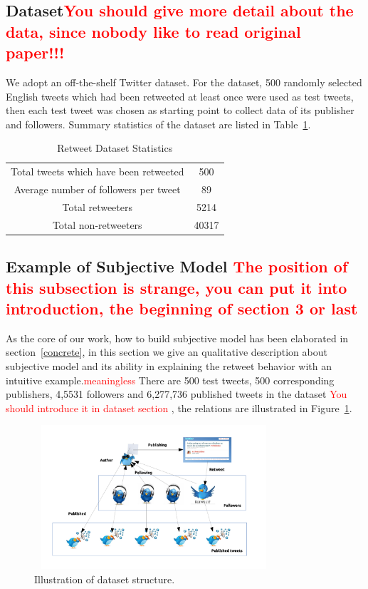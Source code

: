 \documentclass{acm_proc_article-sp}
\newcommand{\mo}[1]{\textcolor{red}{#1}}
\begin{document}
\subsection{Dataset\mo{You should give more detail about the data, since nobody like to read original paper!!!}}
We adopt an off-the-shelf Twitter dataset\cite{Luo:2013RMF}.
For the dataset, 500 randomly selected English tweets which had been retweeted at least once were used as test tweets, then each test tweet was chosen as starting point to collect data of its publisher and followers.
Summary statistics of the dataset are listed in Table~\ref{datasetstat}.
\begin{table}
\centering
\caption{Retweet Dataset Statistics}
\label{datasetstat}
\begin{tabular}{|c|c|}
\hline
Total tweets which have been retweeted & 500 \\
Average number of followers per tweet & 89 \\
Total retweeters & 5214 \\
Total non-retweeters & 40317  \\
\hline
\end{tabular}
\end{table}

\subsection{Example of Subjective Model \mo{The position of this subsection is strange, you can put it into introduction, the beginning of section 3 or last}}
\label{example}
As the core of our work, how to build subjective model has been elaborated in section~\ref{concrete}, in this section we give an qualitative description about subjective model and its ability in explaining the retweet behavior with an intuitive example.\mo{meaningless} 
There are 500 test tweets, 500 corresponding publishers, 4,5531 followers and 6,277,736 published tweets in the dataset \mo{You should introduce it in dataset section} , the relations are illustrated in Figure~\ref{fig:graph3}.

\begin{figure}[htb]
\centering%
\includegraphics[width=3.5in,height=2.1in]{dataset.pdf}
\caption{Illustration of dataset structure.}
\label{fig:graph3}
\end{figure}
\end{document}
